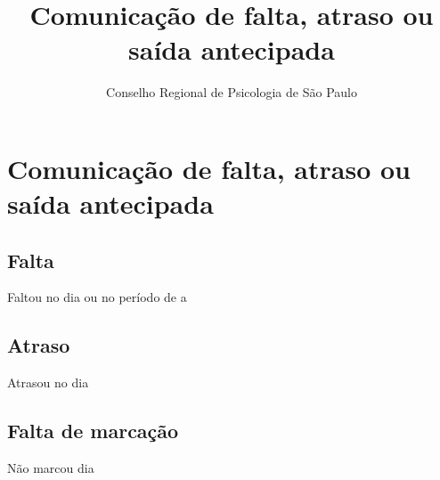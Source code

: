 \documentclass[openright, oneside, a4paper, article, brazil]{abntex2}
\title{Comunicação de falta, atraso ou saída antecipada}
\author{Conselho Regional de Psicologia de São Paulo}
\begin{document}
\pagestyle{crp}
\centering
\Form
\section{Comunicação de falta, atraso ou saída antecipada}%
\setasuspacing{\DoubleSpacing}\justifying

 \hfill {}

\setasuspacing{\SingleSpacing}
\begin{framed}%
    \centering\vspace*{-3ex}
    \subsection{Falta}
    \noindent\small Faltou no dia  ou no período de  a 
\end{framed}
\begin{framed}%
    \centering\vspace*{-3ex}
    \subsection{Atraso}
    \noindent\small Atrasou no dia  \hfill {}
\end{framed}
\begin{framed}%
    \centering\vspace*{-3ex}
    \subsection{Falta de marcação}
    \noindent\small Não marcou dia 
    \vspace{\baselineskip}

    \footnotesize
    \begin{minipage}{0.25\linewidth}
    \end{minipage}%
    \begin{minipage}{0.25\linewidth}
    \end{minipage}%
    \begin{minipage}{0.25\linewidth}
    \end{minipage}%
    \begin{minipage}{0.25\linewidth}
    \end{minipage}%
\end{framed}
\end{document}

